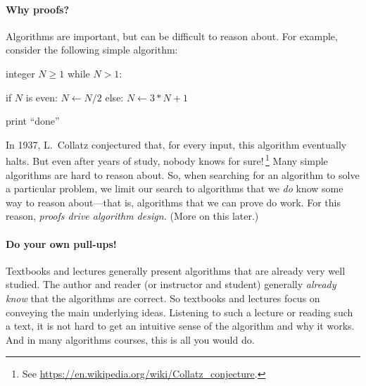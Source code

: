 \paragraph{Why proofs?}
Algorithms are important, but can be difficult to reason about.
For example, consider the following simple algorithm:

\begin{framed}
  \vspace*{-1ex}
  \begin{steps}
  \item[\bf input:] integer $N\ge 1$
    \step while $N > 1$:
    \begin{block}
      \step if $N$ is even:  $N\leftarrow N/2$
      \step else: $N\leftarrow 3*N + 1$
    \end{block}
    \step print ``done''
  \end{steps}
  \vspace*{-1ex}
\end{framed}

In 1937, L.~Collatz conjectured that, for every input, this algorithm eventually halts.
But even after years of study, nobody knows for sure!\,\footnote
{See \url{https://en.wikipedia.org/wiki/Collatz_conjecture}.}
Many simple algorithms are hard to reason about.
So, when searching for an algorithm to solve a particular problem,
we limit our search to algorithms that
we \emph{do} know some way to reason about---that is, algorithms that we can prove do work.
For this reason, \emph{proofs drive algorithm design.}
(More on this later.)

\paragraph{Do your own pull-ups!}
Textbooks and lectures generally present algorithms that are already very well studied.
The author and reader (or instructor and student) generally \emph{already know} that the algorithms are correct.
So textbooks and lectures focus on conveying the main underlying ideas.
Listening to such a lecture or reading such a text,
it is not hard to get an intuitive sense of the algorithm and why it works.
And in many algorithms courses, this is all you would do.

